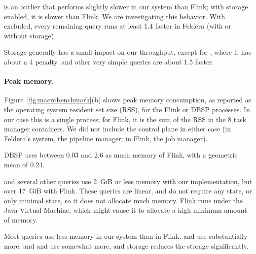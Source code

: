  is an outlier that performs slightly slower in our system
than Flink; with storage enabled, it is slower than Flink.  We are
investigating this behavior.  With  excluded, every
remaining query runs at least 1.4\x{} faster in Feldera (with or
without storage).

Storage generally has a small impact on our throughput, except for
, where it has about a 4\x{} penalty.   and other
very simple queries are about 1.5\x{} faster.

\paragraph{Peak memory.}

Figure~\ref{fig:macrobenchmark}(b) shows peak memory consumption, as
reported as the operating system resident set size (RSS), for the
Flink or DBSP processes.  In our case this is a single process; for
Flink, it is the sum of the RSS in the 8 task manager containers.  We
did not include the control plane in either case (in Feldera's system,
the pipeline manager; in Flink, the job manager).

DBSP uses between 0.03\x{} and 2.6\x{} as much memory of Flink, with a
geometric mean of 0.24\x{}.

 and several other queries use 2~GiB or less memory with our
implementation, but over 17~GiB with Flink.  These queries are linear,
and do not require any state, or only minimal state, so it does not
allocate much memory.  Flink runs under the Java Virtual Machine,
which might cause it to allocate a high minimum amount of memory.

Most queries use less memory in our system than in Flink.  
and  use substantially more, and  and
 use somewhat more, and storage reduces the storage
significantly.
